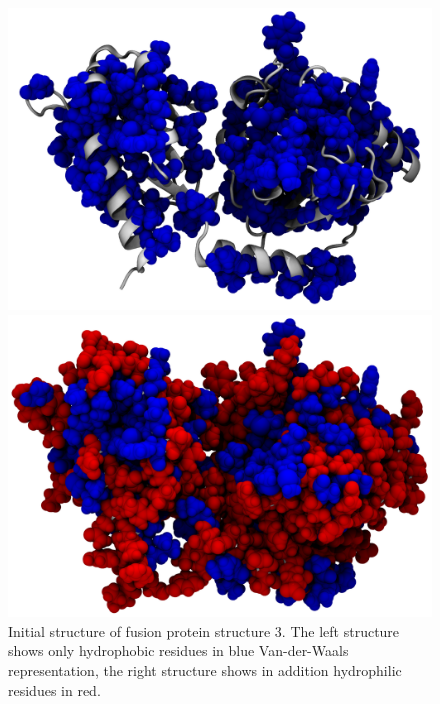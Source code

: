 \documentclass[english, a4paper, 12pt, titlepage, draft]{article}
\begin{document}

\begin{figure}
    \begin{minipage}[]{0.45\linewidth}
        \centering
        \includegraphics[width=\textwidth]{figures/Complex_hydrophobic_core/hydrophobic_core_linker.png}
    \end{minipage}
\hspace{0.5cm}
    \begin{minipage}[]{0.45\linewidth}
        \centering
        \includegraphics[width=\textwidth]{figures/Complex_hydrophobic_core/protein.png}
    \end{minipage}
    \caption{Initial structure of fusion protein structure 3. The left structure shows only hydrophobic residues in blue Van-der-Waals representation, the right structure shows in addition hydrophilic residues in red.}
    \label{fig:hydrophobic_core}
\end{figure}     
\end{document}
